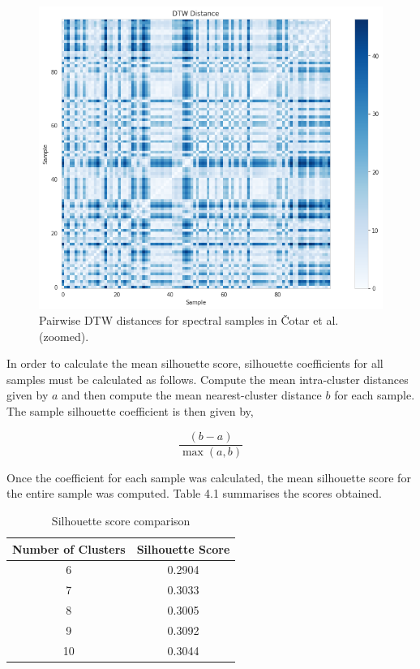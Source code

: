 \begin{figure}[t]
\centering
\includegraphics[scale=0.60]{figures/dtw cotar zoomed.png}
\caption{Pairwise DTW distances for spectral samples in Čotar et al. (zoomed).}
\end{figure}

In order to calculate the mean silhouette score, silhouette coefficients for all samples must be calculated as follows. Compute the mean intra-cluster distances given by $a$ and then compute the mean nearest-cluster distance $b$ for each sample. The sample silhouette coefficient is then given by,

\begin{equation}
\frac{(b-a)}{\max_{}(a,b)}
\end{equation}

Once the coefficient for each sample was calculated, the mean silhouette score for the entire sample was computed. Table 4.1 summarises the scores obtained.

\begin{table}[]
\begin{center}
\begin{tabular}{|c|c|}
\hline
\textbf{Number of Clusters} & \textbf{Silhouette Score} \\ \hline
6                     & 0.2904                    \\ \hline
7                     & 0.3033                    \\ \hline
8                     & 0.3005                    \\ \hline
9                     & 0.3092                    \\ \hline
10                    & 0.3044                    \\ \hline
\end{tabular}
\caption{Silhouette score comparison}
\label{table:Silhouette Score}
\end{center}
\end{table}

